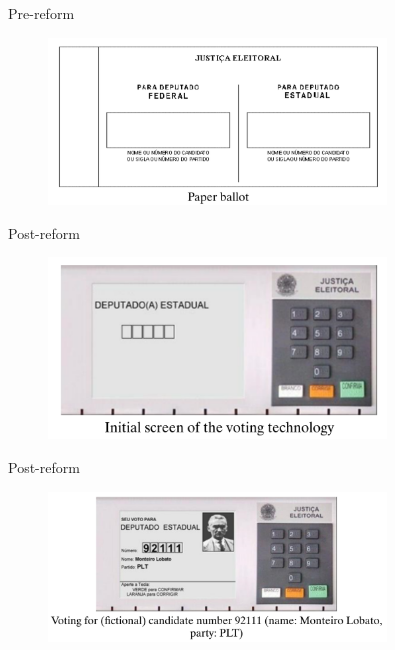 \documentclass[11pt,notes=hide,aspectratio=169,mathserif]{beamer}
\begin{document}
\begin{frame}{Pre-reform}
\begin{figure}
\centering
\includegraphics[width=0.8\textwidth]{inputs/fig1.png}
\end{figure}
\end{frame}

\begin{frame}{Post-reform}
\begin{figure}
\centering
\includegraphics[width=0.8\textwidth]{inputs/fig2.png}
\end{figure}
\end{frame}

\begin{frame}{Post-reform}
\begin{figure}
\centering
\includegraphics[width=0.8\textwidth]{inputs/fig3.png}
\end{figure}
\end{frame}
\end{document}
